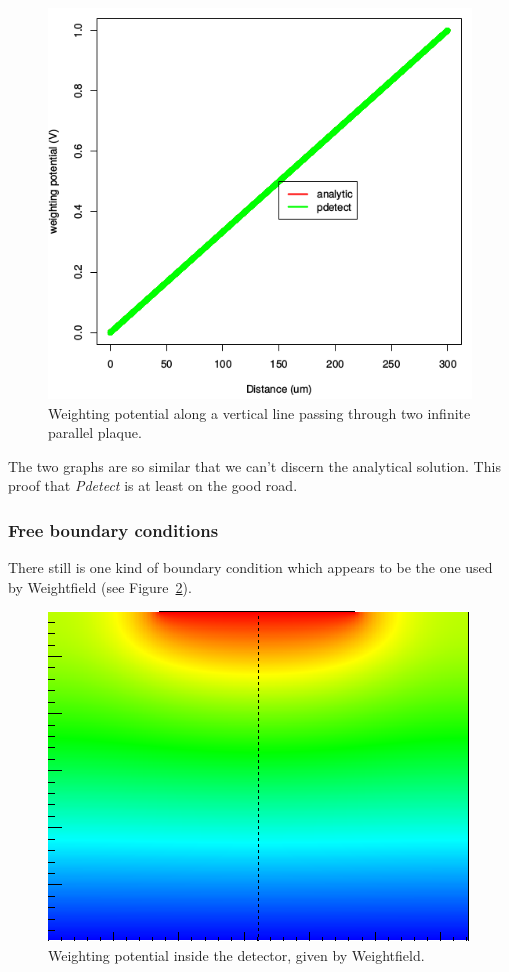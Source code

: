 \documentclass[11pt]{article}
\begin{document}
			\begin{figure}[H]
				\center
				\includegraphics[scale=0.45]{images/boundary_conditions/parallel.png}
				\caption{Weighting potential along a vertical line passing through two infinite parallel plaque.}
				\label{fig:parallel}
			\end{figure}

			The two graphs are so similar that we can't discern the analytical solution. This proof that
			\textit{Pdetect} is at least on the good road.

		\subsubsection{Free boundary conditions}

			There still is one kind of boundary condition which appears to be the one used by Weightfield
			(see Figure~\ref{fig:weight_free}).

			\begin{figure}[H]
				\center
				\includegraphics[scale=0.45]{images/boundary_conditions/weight_free.png}
				\caption{Weighting potential inside the detector, given by Weightfield.}
				\label{fig:weight_free}
			\end{figure}
\end{document}
